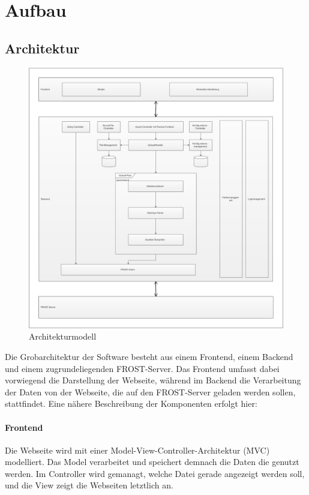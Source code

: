 \section{Aufbau}

\subsection{Architektur}
\begin{figure}[htbp]
\centering
\includegraphics[scale=0.44]{uml/architektur.eps}
\caption{\label{fig:architektur} Architekturmodell}
\end{figure}

Die Grobarchitektur der Software besteht aus einem Frontend, einem Backend und einem zugrundeliegenden FROST-Server. Das Frontend umfasst dabei vorwiegend die Darstellung der Webseite, während im Backend die Verarbeitung der Daten von der Webseite, die auf den FROST-Server geladen werden sollen, stattfindet. Eine nähere Beschreibung der Komponenten erfolgt hier:

\paragraph{Frontend}
Die Webseite wird mit einer Model-View-Controller-Architektur (MVC) modelliert.
Das Model verarbeitet und speichert demnach die Daten die genutzt werden.
Im Controller wird gemanagt, welche Datei gerade angezeigt werden soll, und die View zeigt die Webseiten letztlich an.

